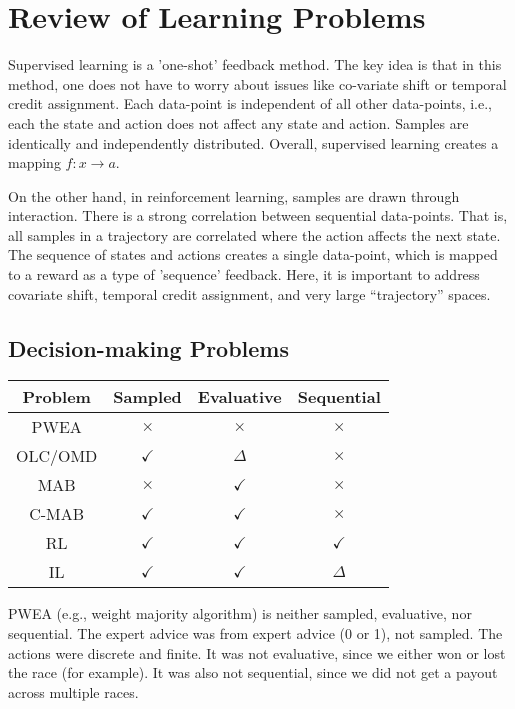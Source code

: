 \documentclass[11pt]{article}
\begin{document}
\section{Review of Learning Problems}
Supervised learning is a 'one-shot' feedback method. The key idea is that in this method, one does not have to worry about issues like co-variate shift or temporal credit assignment. Each data-point is independent of all other data-points, i.e., each the state and action does not affect any state and action. Samples are identically and independently distributed. Overall, supervised learning creates a mapping $f:x\to a$.

On the other hand, in reinforcement learning, samples are drawn through interaction. There is a strong correlation between sequential data-points. That is, all samples in a trajectory are correlated where the action affects the next state. The sequence of states and actions creates a single data-point, which is mapped to a reward as a type of 'sequence' feedback. Here, it is important to address covariate shift, temporal credit assignment, and very large “trajectory” spaces.

\subsection{Decision-making Problems}

\begin{table}[h]
    \centering
    \begin{tabular}{|c|c|c|c|}
    \hline 
    Problem & Sampled & Evaluative & Sequential\\ \hline 
      PWEA   & $\times$ & $\times$ & $\times$\\ \hline 
        OLC/OMD     & $\checkmark$ & $\Delta$ & $\times$ \\ \hline 
            MAB    & $\times$ & $\checkmark$ & $\times$ \\ \hline 
               C-MAB    &$\checkmark$ & $\checkmark$& $\times$ \\ \hline 
   RL & $\checkmark$& $\checkmark$&$\checkmark$\\ \hline 
   IL   & $\checkmark$& $\checkmark$& $\Delta$\\ \hline
    \end{tabular}
    \label{tab:t1}
\end{table}
PWEA (e.g., weight majority algorithm) is neither sampled, evaluative, nor sequential. The expert advice was from expert advice (0 or 1), not sampled. The actions were discrete and finite. It was not evaluative, since we either won or lost the race (for example). It was also not sequential, since we did not get a payout across multiple races. 
\end{document}
